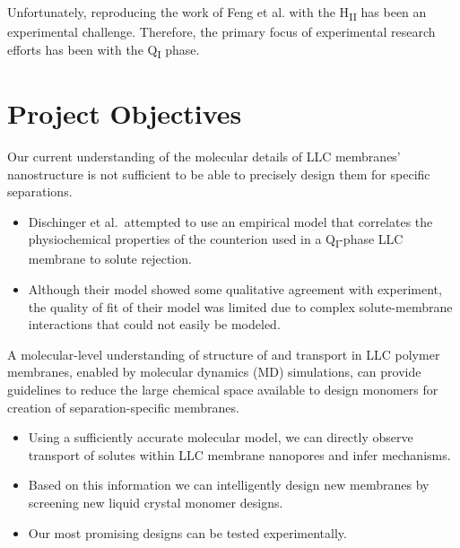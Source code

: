 \documentclass{article}
\begin{document}
  Unfortunately, reproducing the work of Feng et al. with the H\textsubscript{II}
  has been an experimental challenge. Therefore, the primary focus of experimental
  research efforts has been with the Q\textsubscript{I} phase.

  \section{Project Objectives}\label{section:objectives}  
  
  Our current understanding of the molecular details of LLC membranes'
  nanostructure is not sufficient to be able to precisely design them for
  specific separations. 
  \begin{itemize} 
    \item Dischinger et al.~attempted to use an empirical model
    that correlates the physiochemical properties of the counterion used in
    a Q\textsubscript{I}-phase LLC membrane to solute rejection.\cite{dischinger_effect_2017}
    \item Although their model showed some qualitative agreement with experiment, the
    quality of fit of their model was limited due to complex solute-membrane
    interactions that could not easily be modeled. 
  \end{itemize}

  A molecular-level understanding of structure of and transport in LLC polymer 
  membranes, enabled by molecular dynamics (MD) simulations, can provide 
  guidelines to reduce the large chemical space available to design
  monomers for creation of separation-specific membranes. 
  \begin{itemize}
    \item Using a sufficiently accurate molecular model, we can directly 
    observe transport of solutes within LLC membrane nanopores and infer
    mechanisms. 
    \item Based on this information we can intelligently design new membranes
    by screening new liquid crystal monomer designs.
    \item Our most promising designs can be tested experimentally.
  \end{itemize}
  
\end{document}
